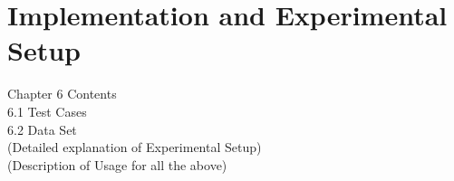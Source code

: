 
\chapter{Implementation and Experimental Setup}\thispagestyle{thesisstyle} %
\graphicspath{{Chapter6/}}
{

Chapter 6 Contents\\
6.1 Test Cases\\
6.2 Data Set\\

(Detailed explanation of Experimental Setup)\\
(Description of Usage for all the above)


















}


